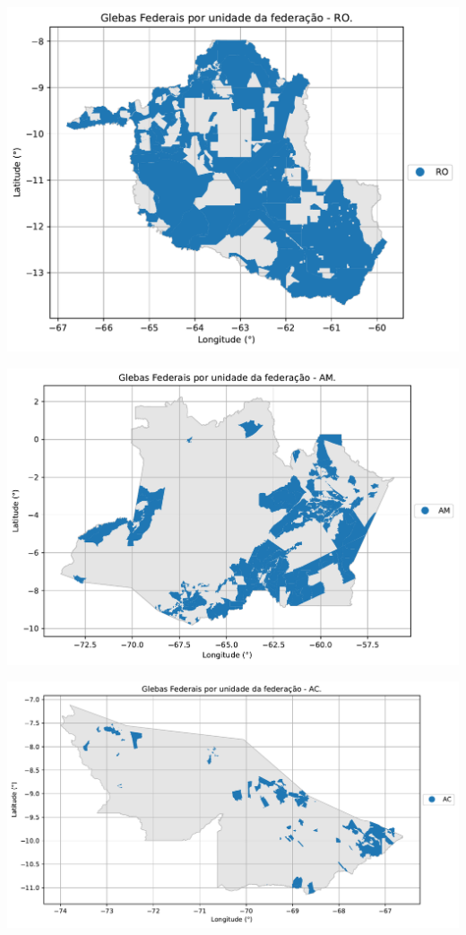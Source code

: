 \documentclass[
  letterpaper,
]{report}
\begin{document}
\includegraphics{./5-delimitacao_files/figure-pdf/cell-6-output-2.pdf}

\includegraphics{./5-delimitacao_files/figure-pdf/cell-6-output-3.pdf}

\includegraphics{./5-delimitacao_files/figure-pdf/cell-6-output-4.pdf}
\end{document}
